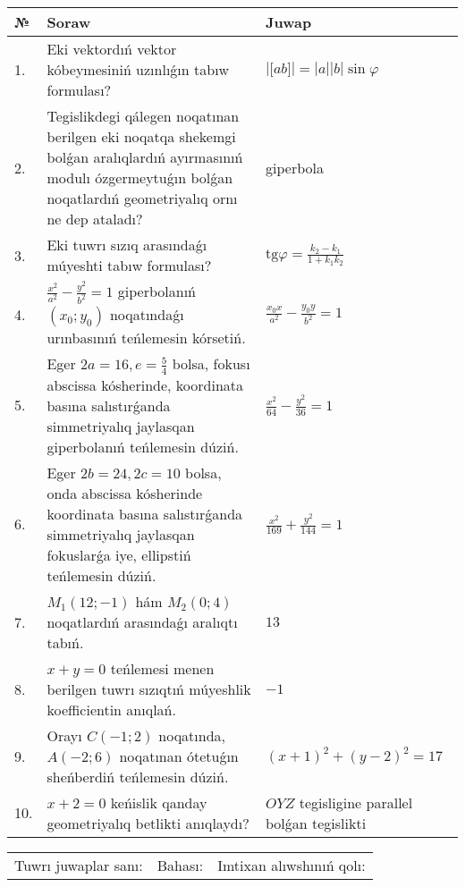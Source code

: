 \documentclass{article}
\begin{document}
\begin{tabular}{|m{0.7cm}|m{10cm}|m{4cm}|}
\hline
№ & Soraw & Juwap \\
\hline
1. & Eki vektordıń vektor kóbeymesiniń uzınlıǵın tabıw formulası? & $\left| \lbrack ab\rbrack \right|=|a||b|\sin\varphi$ \\
\hline
2. & Tegislikdegi qálegen noqatınan berilgen eki noqatqa shekemgi bolǵan aralıqlardıń ayırmasınıń modulı ózgermeytuǵın bolǵan noqatlardıń geometriyalıq ornı ne dep ataladı? & giperbola \\
\hline
3. & Eki tuwrı sızıq arasındaǵı múyeshti tabıw formulası? & $\text{tg}\varphi=\frac{k_2-k_1}{1+k_1k_2}$ \\
\hline
4. & $\frac{x^2}{a^2}-\frac{y^2}{b^2}=1$ giperbolanıń $(x_0;y_0)$ noqatındaǵı urınbasınıń teńlemesin kórsetiń. & $\frac{x_0x}{a^2}-\frac{y_0y}{b^2}=1$ \\
\hline
5. & Eger $2a=16, e=\frac{5}{4}$ bolsa, fokusı abscissa kósherinde, koordinata basına salıstırǵanda simmetriyalıq jaylasqan giperbolanıń teńlemesin dúziń. & $\frac{x^{2}}{64}-\frac{y^{2}}{36}=1$ \\
\hline
6. & Eger $2b=24, 2 c=10$ bolsa, onda abscissa kósherinde koordinata basına salıstırǵanda simmetriyalıq jaylasqan fokuslarǵa iye, ellipstiń teńlemesin dúziń. & $\frac{x^{2}}{169}+\frac{y^{2}}{144}=1$ \\
\hline
7. & $M_{1} (12;-1)$ hám $M_{2} (0;4)$ noqatlardıń arasındaǵı aralıqtı tabıń. & $13$ \\
\hline
8. & $x+y=0$ teńlemesi menen berilgen tuwrı sızıqtıń múyeshlik koefficientin anıqlań. & $- 1$ \\
\hline
9. & Orayı $C (-1;2)$ noqatında, $A (-2;6 )$ noqatınan ótetuǵın sheńberdiń teńlemesin dúziń. & $(x+1)^{2}+(y-2)^{2}=17$ \\
\hline
10. & $x+2=0$ keńislik qanday geometriyalıq betlikti anıqlaydı? &  $OYZ$ tegisligine parallel bolǵan tegislikti \\
\hline
\end{tabular}

\vspace{1cm}

\begin{tabular}{lll}
Tuwrı juwaplar sanı: \underline{\hspace{1.5cm}} & 
Bahası: \underline{\hspace{1.5cm}} & 
Imtixan alıwshınıń qolı: \underline{\hspace{2cm}} \\
\end{tabular}
\end{document}
